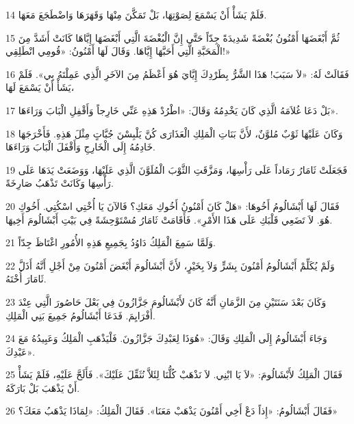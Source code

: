 \par 14 فَلَمْ يَشَأْ أَنْ يَسْمَعَ لِصَوْتِهَا، بَلْ تَمَكَّنَ مِنْهَا وَقَهَرَهَا وَاضْطَجَعَ مَعَهَا.
\par 15 ثُمَّ أَبْغَضَهَا أَمْنُونُ بُغْضَةً شَدِيدَةً جِدّاً حَتَّى إِنَّ الْبُغْضَةَ الَّتِي أَبْغَضَهَا إِيَّاهَا كَانَتْ أَشَدَّ مِنَ الْمَحَبَّةِ الَّتِي أَحَبَّهَا إِيَّاهَا. وَقَالَ لَهَا أَمْنُونُ: «قُومِي انْطَلِقِي!»
\par 16 فَقَالَتْ لَهُ: «لاَ سَبَبَ! هَذَا الشَّرُّ بِطَرْدِكَ إِيَّايَ هُوَ أَعْظَمُ مِنَ الآخَرِ الَّذِي عَمِلْتَهُ بِي». فَلَمْ يَشَأْ أَنْ يَسْمَعَ لَهَا،
\par 17 بَلْ دَعَا غُلاَمَهُ الَّذِي كَانَ يَخْدِمُهُ وَقَالَ: «اطْرُدْ هَذِهِ عَنِّي خَارِجاً وَأَقْفِلِ الْبَابَ وَرَاءَهَا».
\par 18 وَكَانَ عَلَيْهَا ثَوْبٌ مُلوَّنٌ، لأَنَّ بَنَاتِ الْمَلِكِ الْعَذَارَى كُنَّ يَلْبِسْنَ جُبَّاتٍ مِثْلَ هَذِهِ. فَأَخْرَجَهَا خَادِمُهُ إِلَى الْخَارِجِ وَأَقْفَلَ الْبَابَ وَرَاءَهَا.
\par 19 فَجَعَلَتْ ثَامَارُ رَمَاداً عَلَى رَأْسِهَا، وَمَزَّقَتِ الثَّوْبَ الْمُلَوَّنَ الَّذِي عَلَيْهَا، وَوَضَعَتْ يَدَهَا عَلَى رَأْسِهَا وَكَانَتْ تَذْهَبُ صَارِخَةً.
\par 20 فَقَالَ لَهَا أَبْشَالُومُ أَخُوهَا: «هَلْ كَانَ أَمْنُونُ أَخُوكِ مَعَكِ؟ فَالآنَ يَا أُخْتِي اسْكُتِي. أَخُوكِ هُوَ. لاَ تَضَعِي قَلْبَكِ عَلَى هَذَا الأَمْرِ». فَأَقَامَتْ ثَامَارُ مُسْتَوْحِشَةً فِي بَيْتِ أَبْشَالُومَ أَخِيهَا.
\par 21 وَلَمَّا سَمِعَ الْمَلِكُ دَاوُدُ بِجَمِيعِ هَذِهِ الأُمُورِ اغْتَاظَ جِدّاً.
\par 22 وَلَمْ يُكَلِّمْ أَبْشَالُومُ أَمْنُونَ بِشَرٍّ وَلاَ بِخَيْرٍ، لأَنَّ أَبْشَالُومَ أَبْغَضَ أَمْنُونَ مِنْ أَجْلِ أَنَّهُ أَذَلَّ ثَامَارَ أُخْتَهُ.
\par 23 وَكَانَ بَعْدَ سَنَتَيْنِ مِنَ الزَّمَانِ أَنَّهُ كَانَ لأَبْشَالُومَ جَزَّازُونَ فِي بَعْلَ حَاصُورَ الَّتِي عِنْدَ أَفْرَايِمَ. فَدَعَا أَبْشَالُومُ جَمِيعَ بَنِي الْمَلِكِ.
\par 24 وَجَاءَ أَبْشَالُومُ إِلَى الْمَلِكِ وَقَالَ: «هُوَذَا لِعَبْدِكَ جَزَّازُونَ. فَلْيَذْهَبِ الْمَلِكُ وَعَبِيدُهُ مَعَ عَبْدِكَ».
\par 25 فَقَالَ الْمَلِكُ لأَبْشَالُومَ: «لاَ يَا ابْنِي. لاَ نَذْهَبْ كُلُّنَا لِئَلاَّ نُثَقِّلَ عَلَيْكَ». فَأَلَحَّ عَلَيْهِ، فَلَمْ يَشَأْ أَنْ يَذْهَبَ بَلْ بَارَكَهُ.
\par 26 فَقَالَ أَبْشَالُومُ: «إِذاً دَعْ أَخِي أَمْنُونَ يَذْهَبْ مَعَنَا». فَقَالَ الْمَلِكُ: «لِمَاذَا يَذْهَبُ مَعَكَ؟»
